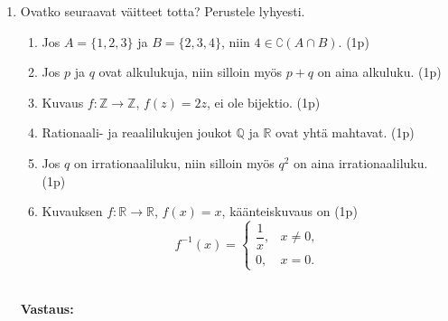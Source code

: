 \documentclass[a4paper,12pt]{article}
\begin{document}
 

\otsikko

\begin{enumerate}

\item Ovatko seuraavat väitteet totta? Perustele lyhyesti.
    \begin{enumerate}
        \item Jos $A=\{1,2,3\}$ ja $B=\{2,3,4\}$, niin $4 \in \complement (A \cap B)$. (1p)
        \item Jos $p$ ja $q$ ovat alkulukuja, niin silloin myös $p+q$ on aina alkuluku. (1p)
        \item Kuvaus $f:\mathbb{Z}\to\mathbb{Z}$, $f(z)=2z$, ei ole bijektio. (1p)
        \item Rationaali- ja reaalilukujen joukot $\mathbb{Q}$ ja $\mathbb{R}$ ovat yhtä mahtavat. (1p)
        \item Jos $q$ on irrationaaliluku, niin silloin myös $q^2$ on aina irrationaaliluku. (1p)
        \item Kuvauksen $f:\mathbb{R}\to\mathbb{R}$, $f(x)=x$, käänteiskuvaus on (1p)
        \[
        f^{-1}(x)=
        \begin{cases}
        \dfrac{1}{x}, & x\neq 0,\\[4pt]
        0, & x=0.
        \end{cases}
        \]
        \\
    \end{enumerate}

    \textbf{Vastaus:}


\end{enumerate}
\end{document}
